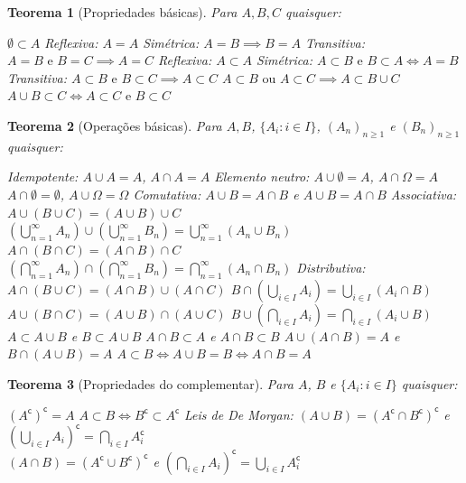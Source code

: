 \documentclass[12pt,a4paper,answers]{article}
\numberwithin{equation}{section} %
\newcommand{\cp}[1]{#1^\mathsf{c}} %
\theoremstyle{thm_estilo}
\newtheorem{theorem}{Teorema}[section]
\theoremstyle{thm_note_est}
\begin{document}
\pagebreak

\begin{theorem}[Propriedades básicas] Para $A,B,C$ quaisquer:
	\begin{outline}[enumerate]
		\1 \( \emptyset \subset A \)
		\1 Reflexiva: \(A = A\)
		\1 Simétrica: \(A = B \implies B = A\)
		\1 Transitiva: \(A = B \text{ e } B = C \implies A=C \) 
		\1 Reflexiva: \(A \subset A\)
		\1 Simétrica: \(A \subset B \text{ e } B \subset A \iff A = B \) 
		\1 Transitiva: \(A \subset B \text{ e } B \subset C \implies A \subset C \)
		\1 \(A \subset B \text{ ou } A \subset C \implies A \subset B\cup C \)
		\1 \(A\cup B \subset C \iff A \subset C \text{ e } B \subset C\)
	\end{outline}
\end{theorem}

\begin{theorem}[Operações básicas] Para $A,B$, $\{A_i: i \in I\}$, $(A_n)_{n\geq1}$ e $(B_n)_{n\geq1}$ quaisquer:
	\begin{outline}[enumerate]
		\1 Idempotente: \( A\cup A = A \), \( A\cap A = A \)
		\1 Elemento neutro: \( A \cup \emptyset = A\), \(A\cap\Omega=A\)
		\1 \( A \cap \emptyset = \emptyset\), \(A\cup\Omega=\Omega\)  
		\1 Comutativa: \(A\cup B = A\cap B\) e \(A\cup B = A\cap B\)
		\1 Associativa: 
			\2 \( A\cup (B\cup C) = (A \cup B)\cup C \)
			\2 \( \left(\bigcup_{n=1}^\infty A_n\right) \cup  \left(\bigcup_{n=1}^\infty B_n\right) = \bigcup_{n=1}^\infty (A_n\cup B_n) \)
			\2 \( A\cap (B\cap C) = (A \cap B)\cap C \)
			\2 \( \left(\bigcap_{n=1}^\infty A_n\right) \cap  \left(\bigcap_{n=1}^\infty B_n\right) = \bigcap_{n=1}^\infty (A_n\cap B_n) \)
		\1 Distributiva:
			\2 \(A\cap(B\cup C) = (A\cap B)\cup(A\cap C) \)
			\2 \(B\cap\left(\bigcup_{i\in I}A_i\right) = \bigcup_{i\in I}(A_i\cap B) \)
			\2 \(A\cup(B\cap C) = (A\cup B)\cap(A\cup C) \)
			\2 \(B\cup\left(\bigcap_{i\in I}A_i\right) = \bigcap_{i\in I}(A_i\cup B) \)
		\1 \(A \subset A\cup B \) e \(B \subset A\cup B \)
		\1 \(A \cap B \subset A \) e \(A \cap B \subset B\)
		\1 \(A\cup(A\cap B) = A\) e \(B\cap(A\cup B) = A\)
		\1 \(A \subset B \iff A\cup B = B \iff A\cap B = A\)
	\end{outline}
\end{theorem}

\begin{theorem}[Propriedades do complementar]
	Para $A$, $B$ e $\{A_i: i \in I\}$ quaisquer:	
	\begin{outline}[enumerate]
		\1 \( \cp{(\cp{A})} = A \)
		\1 \( A\subset B \iff \cp{B} \subset \cp{A} \)
		\1 Leis de De Morgan:
			\2 \( (A\cup B) = \cp{(\cp{A}\cap\cp{B})} \) e \( \cp{\left( \bigcup_{i\in I}A_i \right)} = \bigcap_{i\in I}\cp{A_i} \)\\
			\2 \( (A\cap B) = \cp{(\cp{A}\cup\cp{B})} \) e \( \cp{\left( \bigcap_{i\in I}A_i \right)} = \bigcup_{i\in I}\cp{A_i} \)
	\end{outline}
\end{theorem}
\end{document}
